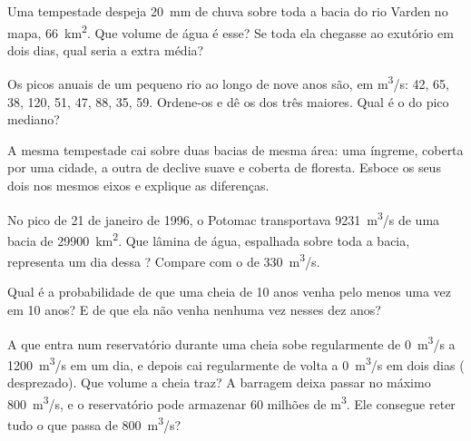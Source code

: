\begin{exercise}[$\star\star$]\label{exo:g10:drainage-basins:7}
Uma tempestade despeja \qty{20}{mm} de chuva sobre toda a bacia do rio
Varden no mapa, \qty{66}{km^2}. Que volume de água é esse? Se toda ela
chegasse ao exutório em dois dias, qual seria a  extra média?
\end{exercise}

\begin{exercise}[$\star\star$]\label{exo:g10:drainage-basins:8}
Os picos anuais de um pequeno rio ao longo de nove anos são, em
\unit{m^3/s}: \num{42}, \num{65}, \num{38}, \num{120}, \num{51}, \num{47},
\num{88}, \num{35}, \num{59}. Ordene-os e dê os  dos três
maiores. Qual é o  do pico mediano?
\end{exercise}

\begin{exercise}[$\star\star$]\label{exo:g10:drainage-basins:9}
A mesma tempestade cai sobre duas bacias de mesma área: uma íngreme, coberta
por uma cidade, a outra de declive suave e coberta de floresta. Esboce os
seus dois  nos mesmos eixos e explique as diferenças.
\end{exercise}

\begin{exercise}[$\star\star$]\label{exo:g10:drainage-basins:10}
No pico de 21 de janeiro de 1996, o Potomac transportava \qty{9231}{m^3/s}
de uma bacia de \qty{29900}{km^2}. Que lâmina de água, espalhada sobre toda
a bacia, representa um dia dessa ? Compare com o  de
\qty{330}{m^3/s}.
\end{exercise}

\begin{exercise}[$\star\star$]\label{exo:g10:drainage-basins:11}
Qual é a probabilidade de que uma cheia de \num{10} anos venha pelo menos
uma vez em \num{10} anos? E de que ela não venha nenhuma vez nesses dez anos?
\end{exercise}

\begin{exercise}[$\star\star\star$]\label{exo:g10:drainage-basins:12}
A  que entra num reservatório durante uma cheia sobe regularmente de
\qty{0}{m^3/s} a \qty{1200}{m^3/s} em um dia, e depois cai regularmente de
volta a \qty{0}{m^3/s} em dois dias ( desprezado). Que
volume a cheia traz? A barragem deixa passar no máximo \qty{800}{m^3/s}, e
o reservatório pode armazenar \num{60} milhões de \unit{m^3}. Ele consegue
reter tudo o que passa de \qty{800}{m^3/s}?
\end{exercise}

